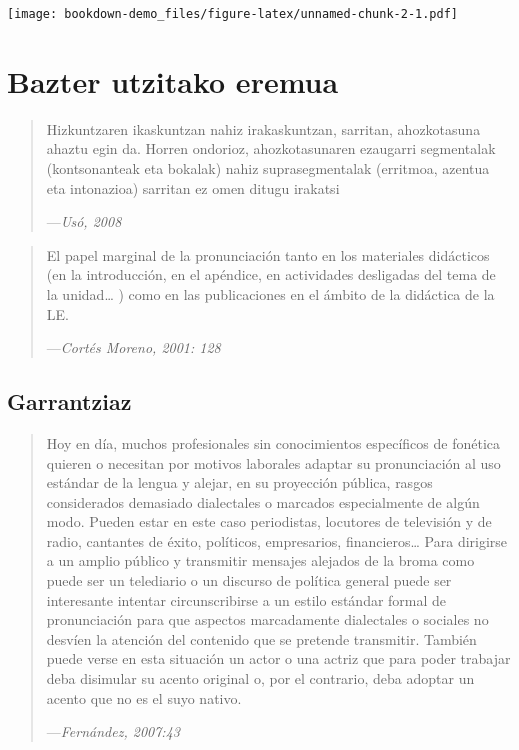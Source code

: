 \documentclass[
]{book}
\begin{document}
\texttt{[image: bookdown-demo\_files/figure-latex/unnamed-chunk-2-1.pdf]}

\hypertarget{bazter-utzitako-eremua}{%
\section{Bazter utzitako eremua}\label{bazter-utzitako-eremua}}

\begin{quote}
Hizkuntzaren ikaskuntzan nahiz irakaskuntzan, sarritan, ahozkotasuna ahaztu
egin da. Horren ondorioz, ahozkotasunaren ezaugarri segmentalak
(kontsonanteak eta bokalak) nahiz suprasegmentalak (erritmoa, azentua eta
intonazioa) sarritan ez omen ditugu irakatsi

---\emph{Usó, 2008}
\end{quote}

\begin{quote}
El papel marginal de la pronunciación tanto en
los materiales didácticos (en la introducción, en
el apéndice, en actividades desligadas del tema
de la unidad\ldots{} ) como en las publicaciones en
el ámbito de la didáctica de la LE.

---\emph{Cortés Moreno, 2001: 128}
\end{quote}

\hypertarget{garrantziaz}{%
\subsection{Garrantziaz}\label{garrantziaz}}

\begin{quote}
Hoy en día, muchos profesionales sin conocimientos específicos de fonética
quieren o necesitan por motivos laborales adaptar su pronunciación al uso
estándar de la lengua y alejar, en su proyección pública, rasgos considerados
demasiado dialectales o marcados especialmente de algún modo. Pueden estar
en este caso periodistas, locutores de televisión y de radio, cantantes de éxito,
políticos, empresarios, financieros\ldots{} Para dirigirse a un amplio público y
transmitir mensajes alejados de la broma como puede ser un telediario o un
discurso de política general puede ser interesante intentar circunscribirse a un
estilo estándar formal de pronunciación para que aspectos marcadamente
dialectales o sociales no desvíen la atención del contenido que se pretende
transmitir. También puede verse en esta situación un actor o una actriz que para
poder trabajar deba disimular su acento original o, por el contrario, deba
adoptar un acento que no es el suyo nativo.

---\emph{Fernández, 2007:43}
\end{quote}
\end{document}

